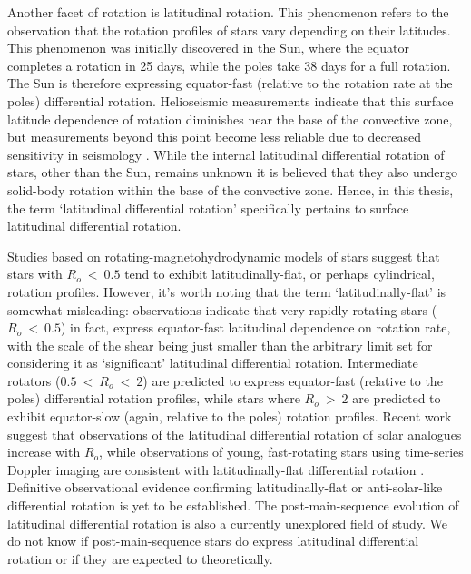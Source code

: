 Another facet of rotation is latitudinal rotation.
This phenomenon refers to the observation that the rotation profiles of stars vary depending on their latitudes. 
This phenomenon was initially discovered in the Sun, where the equator completes a rotation in 25 days, while the poles take 38 days for a full rotation. 
The Sun is therefore expressing equator-fast (relative to the rotation rate at the poles) differential rotation.
Helioseismic measurements indicate that this surface latitude dependence of rotation diminishes near the base of the convective zone, but measurements beyond this point become less reliable due to decreased sensitivity in seismology \citep{howe_solar_2009}.
While the internal latitudinal differential rotation of stars, other than the Sun, remains unknown it is believed that they also undergo solid-body rotation within the base of the convective zone. Hence, in this thesis, the term `latitudinal differential rotation' specifically pertains to surface latitudinal differential rotation.

Studies based on rotating-magnetohydrodynamic models of stars \citep{brun_powering_2022} suggest that stars with $R_o \ < \ 0.5$ tend to exhibit latitudinally-flat, or perhaps cylindrical, rotation profiles.
However, it's worth noting that the term `latitudinally-flat' is somewhat misleading: observations indicate that very rapidly rotating stars ($R_o \ < \ 0.5$) in fact, express equator-fast latitudinal dependence on rotation rate, with the scale of the shear being just smaller than the arbitrary limit set for considering it as `significant' latitudinal differential rotation.
Intermediate rotators ($0.5 \ < \ R_o \ < \ 2$) are predicted to express equator-fast (relative to the poles) differential rotation profiles, while stars where $R_o \ > \ 2$ are predicted to exhibit equator-slow (again, relative to the poles) rotation profiles.
Recent work \citep{benomar_asteroseismic_2018} suggest that observations of the latitudinal differential rotation of solar analogues increase with $R_o$, while observations of young, fast-rotating stars using time-series Doppler imaging are consistent with latitudinally-flat differential rotation \citep[see, e.g.,][]{lanza_evaluation_1996}.
Definitive observational evidence confirming latitudinally-flat or anti-solar-like differential rotation is yet to be established.
The post-main-sequence evolution of latitudinal differential rotation is also a currently unexplored field of study.
We do not know if post-main-sequence stars do express latitudinal differential rotation or if they are expected to theoretically.



